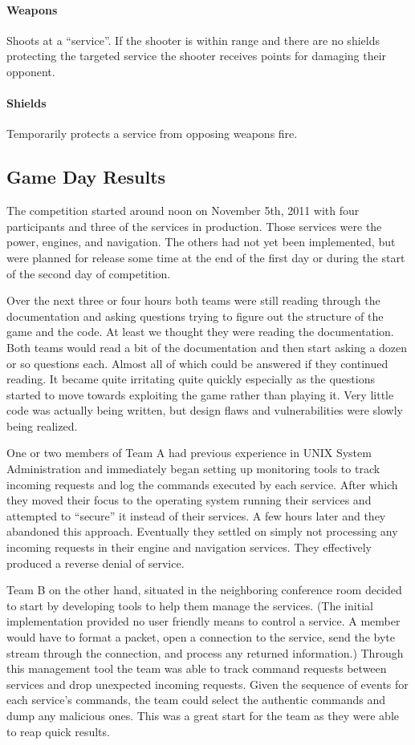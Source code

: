 \documentclass[10pt]{article}
\begin{document}
\paragraph*{Weapons} Shoots at a ``service''.  If the shooter is within range
and there are no shields protecting the targeted service the shooter receives
points for damaging their opponent.

\paragraph*{Shields} Temporarily protects a service from opposing weapons fire.

\subsection{Game Day Results}
The competition started around noon on November 5th, 2011 with four participants
and three of the services in production. Those services were the power, engines,
and navigation. The others had not yet been implemented, but were planned for
release some time at the end of the first day or during the start of the second
day of competition.

Over the next three or four hours both teams were still reading through the
documentation and asking questions trying to figure out the structure of the
game and the code. At least we thought they were reading the documentation.
Both teams would read a bit of the documentation and then start asking a
dozen or so questions each. Almost all of which could be answered if they
continued reading. It became quite irritating quite quickly especially as
the questions started to move towards exploiting the game rather than
playing it. Very little code was actually being written, but design flaws and
vulnerabilities were slowly being realized.

One or two members of Team A had previous experience in UNIX System
Administration and immediately began setting up monitoring tools to track
incoming requests and log the commands executed by each service. After which
they moved their focus to the operating system running their services and
attempted to ``secure'' it instead of their services. A few hours later and they
abandoned this approach. Eventually they settled on simply not processing any
incoming requests in their engine and navigation services. They effectively
produced a reverse denial of service.

Team B on the other hand, situated in the neighboring conference room decided to
start by developing tools to help them manage the services. (The initial
implementation provided no user friendly means to control a service. A member
would have to format a packet, open a connection to the service, send the
byte stream through the connection, and process any returned information.)
Through this management tool the team was able to track command requests between
services and drop unexpected incoming requests. Given the sequence of events for
each service's commands, the team could select the authentic commands and dump
any malicious ones. This was a great start for the team as they were able to
reap quick results.
\end{document}
